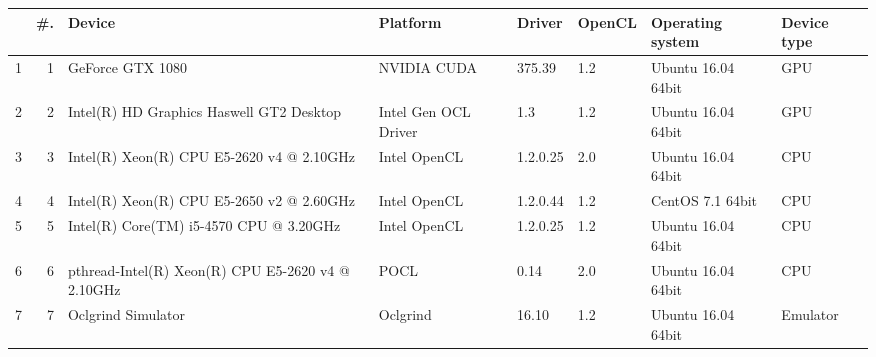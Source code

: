 \begin{tabular}{lrllllll}
\toprule
{} &  \#. &                                             Device &              Platform &    Driver & OpenCL &    Operating system & Device type \\
\midrule
1 &   1 &                                   GeForce GTX 1080 &           NVIDIA CUDA &    375.39 &    1.2 &  Ubuntu 16.04 64bit &         GPU \\
2 &   2 &           Intel(R) HD Graphics Haswell GT2 Desktop &  Intel Gen OCL Driver &       1.3 &    1.2 &  Ubuntu 16.04 64bit &         GPU \\
3 &   3 &          Intel(R) Xeon(R) CPU E5-2620 v4 @ 2.10GHz &          Intel OpenCL &  1.2.0.25 &    2.0 &  Ubuntu 16.04 64bit &         CPU \\
4 &   4 &          Intel(R) Xeon(R) CPU E5-2650 v2 @ 2.60GHz &          Intel OpenCL &  1.2.0.44 &    1.2 &    CentOS 7.1 64bit &         CPU \\
5 &   5 &            Intel(R) Core(TM) i5-4570 CPU @ 3.20GHz &          Intel OpenCL &  1.2.0.25 &    1.2 &  Ubuntu 16.04 64bit &         CPU \\
6 &   6 &  pthread-Intel(R) Xeon(R) CPU E5-2620 v4 @ 2.10GHz &                  POCL &      0.14 &    2.0 &  Ubuntu 16.04 64bit &         CPU \\
7 &   7 &                                 Oclgrind Simulator &              Oclgrind &     16.10 &    1.2 &  Ubuntu 16.04 64bit &    Emulator \\
\bottomrule
\end{tabular}
